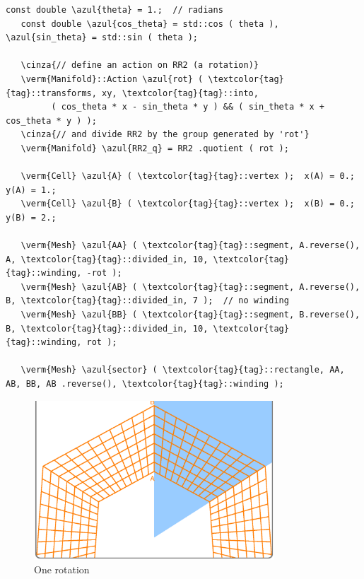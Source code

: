 \begin{Verbatim}[commandchars=\\\{\},formatcom=\small\tt,frame=single,
   label=parag-\ref{\numb section 7.\numb parag 11}.cpp,rulecolor=\color{coment},
   baselinestretch=0.94,framesep=2mm                                             ]
   const double \azul{theta} = 1.;  // radians
   const double \azul{cos_theta} = std::cos ( theta ), \azul{sin_theta} = std::sin ( theta );
	
   \cinza{// define an action on RR2 (a rotation)}
   \verm{Manifold}::Action \azul{rot} ( \textcolor{tag}{tag}::transforms, xy, \textcolor{tag}{tag}::into,
         ( cos_theta * x - sin_theta * y ) && ( sin_theta * x + cos_theta * y ) );
   \cinza{// and divide RR2 by the group generated by 'rot'}
   \verm{Manifold} \azul{RR2_q} = RR2 .quotient ( rot );

   \verm{Cell} \azul{A} ( \textcolor{tag}{tag}::vertex );  x(A) = 0.;  y(A) = 1.;
   \verm{Cell} \azul{B} ( \textcolor{tag}{tag}::vertex );  x(B) = 0.;  y(B) = 2.;

   \verm{Mesh} \azul{AA} ( \textcolor{tag}{tag}::segment, A.reverse(), A, \textcolor{tag}{tag}::divided_in, 10, \textcolor{tag}{tag}::winding, -rot );
   \verm{Mesh} \azul{AB} ( \textcolor{tag}{tag}::segment, A.reverse(), B, \textcolor{tag}{tag}::divided_in, 7 );  // no winding
   \verm{Mesh} \azul{BB} ( \textcolor{tag}{tag}::segment, B.reverse(), B, \textcolor{tag}{tag}::divided_in, 10, \textcolor{tag}{tag}::winding, rot );

   \verm{Mesh} \azul{sector} ( \textcolor{tag}{tag}::rectangle, AA, AB, BB, AB .reverse(), \textcolor{tag}{tag}::winding );
\end{Verbatim}

\begin{figure}[ht] \centering
  \includegraphics[width=90mm]{sector-1.eps}
  \caption{One rotation}
  \label{\numb section 7.\numb fig 7}
\end{figure}

